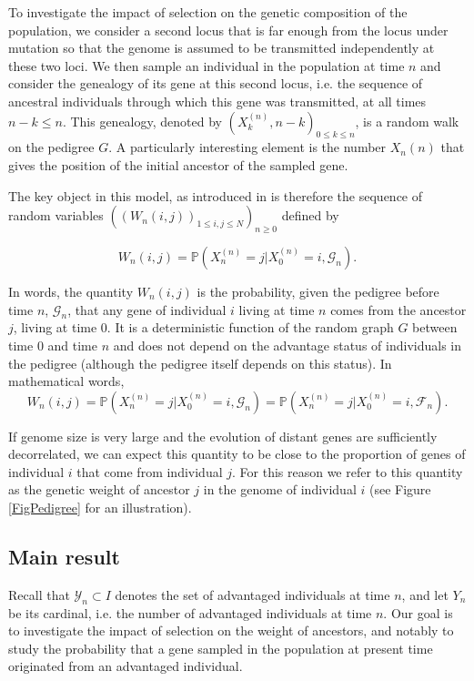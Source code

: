 \documentclass[11pt]{article}
\theoremstyle{remark}
\numberwithin{equation}{section}
\begin{document}
To investigate the impact of selection on the genetic composition of the population, we consider a second locus that is far enough from the locus under mutation so that the genome is assumed to be transmitted independently at these two loci. We then sample an individual in the population at time $n$ and consider the genealogy of its gene at this second locus, i.e. the sequence of ancestral individuals through which this gene was transmitted, at all times $n-k\leq n$. This genealogy, denoted by $(X^{(n)}_k, n-k)_{0\leq k\leq n}$, is a random walk on the pedigree $G$. A particularly interesting element is the number $X_n{(n)}$ that gives the position of the initial ancestor of the sampled gene.

The key object in this model, as introduced in \cite{geneal} is therefore the sequence of random variables $((W_n(i,j))_{1\leq i,j\leq N})_{n\geq 0}$ defined by

\begin{equation} \label{eq:defA} W_n(i,j)=\mathbb{P}(X^{(n)}_n=j|X^{(n)}_0=i,\mathcal{G}_n).\end{equation}

In words, the quantity $W_n(i,j)$ is the probability, given the pedigree before time $n$, $\mathcal{G}_n$, that any gene of individual $i$ living at time $n$ comes from the ancestor $j$, living at time $0$. It is a deterministic function of the random graph $G$ between time $0$ and time $n$ and does not depend on the advantage status of individuals in the pedigree (although the pedigree itself depends on this status). In mathematical words,
$$W_n(i,j)=\mathbb{P}(X^{(n)}_n=j|X^{(n)}_0=i,\mathcal{G}_n)=\mathbb{P}(X^{(n)}_n=j|X^{(n)}_0=i,\mathcal{F}_n).$$

If genome size is very large and the evolution of distant genes are sufficiently decorrelated, we can expect this quantity to be close to the proportion of genes of individual $i$ that come from individual $j$. For this reason we refer to this quantity as the genetic weight of ancestor $j$ in the genome of individual $i$ (see Figure \ref{FigPedigree} for an illustration).

\subsection{Main result}\label{sec:IntroResult}

Recall that $\mathcal{Y}_n\subset I$ denotes the set of advantaged individuals at time $n$, and let $Y_n$ be its cardinal, i.e. the number of advantaged individuals at time $n$. Our goal is to investigate the impact of selection on the weight of ancestors, and notably to study the probability that a gene sampled in the population at present time originated from an advantaged individual. 
\end{document}
